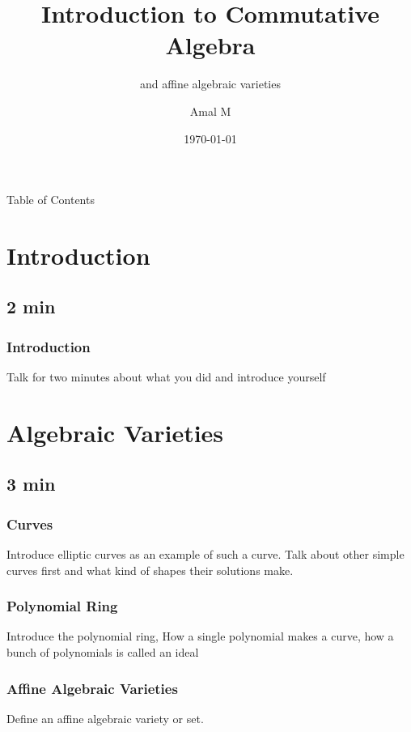 \documentclass[pdf]{beamer}
\title{Introduction to Commutative Algebra}
\subtitle{and affine algebraic varieties}
\author{Amal M}
\date{\today}
\begin{document}

\begin{frame}
    \thispagestyle{empty}
    \titlepage
\end{frame}
\addtocounter{framenumber}{-1}

\begin{frame}{Table of Contents}
    \tableofcontents
\end{frame}


\section{Introduction}
\subsection{2 min}


\begin{frame}
    \frametitle{Introduction}
    Talk for two minutes about what you did and introduce yourself
\end{frame}


\section{Algebraic Varieties}
\subsection{3 min}

\begin{frame}
    \frametitle{Curves}
    Introduce elliptic curves as an example of such a curve. Talk about other simple curves first and what kind of shapes their solutions make.
\end{frame}

\begin{frame}
    \frametitle{Polynomial Ring}
    Introduce the polynomial ring, How a single polynomial makes a curve, how a bunch of polynomials is called an ideal 
\end{frame}

\begin{frame}
    \frametitle{Affine Algebraic Varieties}
    Define an affine algebraic variety or set. 
\end{frame}    
\end{document}
